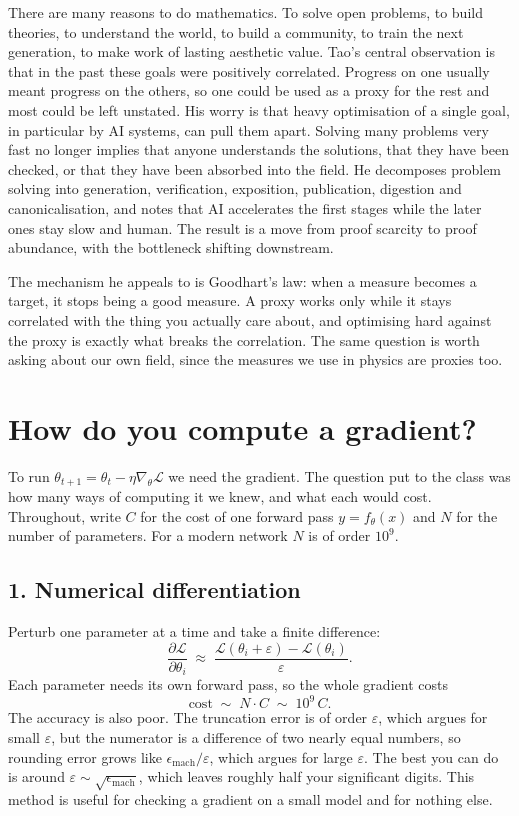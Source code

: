 \documentclass[11pt]{article}
\newcommand{\Loss}{\mathcal{L}}
\begin{document}
\medskip
\noindent
There are many reasons to do mathematics. To solve open problems, to build theories, to
understand the world, to build a community, to train the next generation, to make work of
lasting aesthetic value. Tao's central observation is that in the past these goals were
positively correlated. Progress on one usually meant progress on the others, so one could
be used as a proxy for the rest and most could be left unstated. His worry is that heavy
optimisation of a single goal, in particular by AI systems, can pull them apart. Solving
many problems very fast no longer implies that anyone understands the solutions, that they
have been checked, or that they have been absorbed into the field. He decomposes problem
solving into generation, verification, exposition, publication, digestion and
canonicalisation, and notes that AI accelerates the first stages while the later ones stay
slow and human. The result is a move from proof scarcity to proof abundance, with the
bottleneck shifting downstream.

\medskip
\noindent
The mechanism he appeals to is Goodhart's law: when a measure becomes a target, it stops
being a good measure. A proxy works only while it stays correlated with the thing you
actually care about, and optimising hard against the proxy is exactly what breaks the
correlation. The same question is worth asking about our own field, since the measures we
use in physics are proxies too.

\section{How do you compute a gradient?}
\label{sec:grad}

To run $\theta_{t+1} = \theta_t - \eta \nabla_\theta \Loss$ we need the gradient. The
question put to the class was how many ways of computing it we knew, and what each would
cost. Throughout, write $C$ for the cost of one forward pass $y = f_\theta(x)$ and $N$ for
the number of parameters. For a modern network $N$ is of order $10^{9}$.

\subsection*{1. Numerical differentiation}

Perturb one parameter at a time and take a finite difference:
%
\[
  \frac{\partial \Loss}{\partial \theta_i}
  \;\approx\;
  \frac{\Loss(\theta_i + \varepsilon) - \Loss(\theta_i)}{\varepsilon}.
\]
%
Each parameter needs its own forward pass, so the whole gradient costs
%
\[
  \text{cost} \;\sim\; N \cdot C \;\sim\; 10^{9}\,C .
\]
%
The accuracy is also poor. The truncation error is of order $\varepsilon$, which argues
for small $\varepsilon$, but the numerator is a difference of two nearly equal numbers, so
rounding error grows like $\epsilon_{\mathrm{mach}}/\varepsilon$, which argues for large
$\varepsilon$. The best you can do is around $\varepsilon \sim \sqrt{\epsilon_{\mathrm{mach}}}$,
which leaves roughly half your significant digits. This method is useful for checking a
gradient on a small model and for nothing else.
\end{document}
